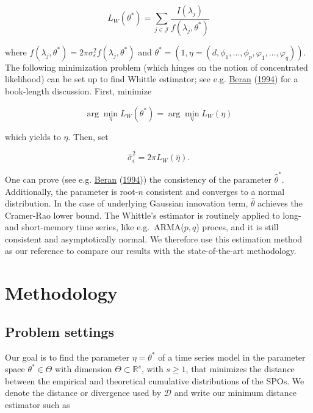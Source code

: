 \documentclass[
  11pt,
]{article}
\begin{document}
\begin{equation}
L_{W}\left(\theta^{*}\right)=\sum_{j \in \mathcal{J}} \frac{I\left(\lambda_{j}\right)}{f\left(\lambda_{j}, \theta^{*}\right)}
\end{equation}

where
\(f\left(\lambda_{j}, \theta^{*}\right)=2 \pi \sigma_{\epsilon}^{2} f\left(\lambda_{j}, \theta^{*}\right)\)
and
\(\theta^{*}=\left(1, \eta=\left(d, \phi_{1}, \ldots, \phi_{p}, \varphi_{1}, \ldots, \varphi_{q}\right)\right)\).
The following minimization problem (which hinges on the notion of
concentrated likelihood) can be set up to find Whittle estimator; see
e.g. \protect\hyperlink{ref-beran1994statistics}{Beran}
(\protect\hyperlink{ref-beran1994statistics}{1994}) for a book-length
discussion. First, minimize

\[\arg \min _{\eta} L_{W}\left(\theta^{*}\right)=\arg \min _{\eta} L_{W}(\eta)\]

which yields to \(\hat{\eta}\). Then, set

\[\hat{\sigma}_{\epsilon}^{2}=2 \pi L_{W}(\hat{\eta}).\]

One can prove (see e.g.
\protect\hyperlink{ref-beran1994statistics}{Beran}
(\protect\hyperlink{ref-beran1994statistics}{1994})) the consistency of
the parameter \(\hat \theta^*\). Additionally, the parameter is
root-\(n\) consistent and converges to a normal distribution. In the
case of underlying Gaussian innovation term, \(\hat \theta\) achieves
the Cramer-Rao lower bound. The Whittle's estimator is routinely applied
to long- and short-memory time series, like e.g.~ARMA(\(p,q\)) proces,
and it is still consistent and asymptotically normal. We therefore use
this estimation method as our reference to compare our results with the
state-of-the-art methodology.

\hypertarget{methodology}{%
\section{Methodology}\label{methodology}}

\hypertarget{problem-settings}{%
\subsection{Problem settings}\label{problem-settings}}

Our goal is to find the parameter \(\eta = \theta^*\) of a time series
model in the parameter space \(\theta^* \in \Theta\) with dimension
\(\Theta \subset \mathbb{R}^{s}\), with \(s \geq 1\), that minimizes the
distance between the empirical and theoretical cumulative distributions
of the SPOs. We denote the distance or divergence used by
\(\mathcal{D}\) and write our minimum distance estimator such as
\end{document}
